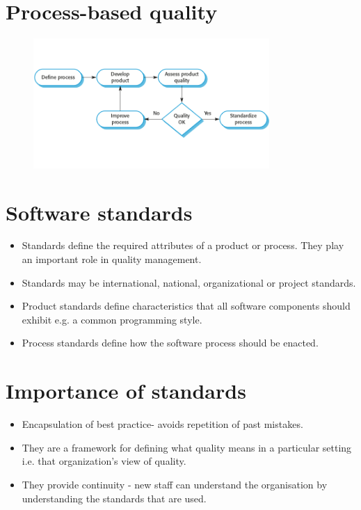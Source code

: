 \section {Process-based quality}
\begin{figure}[h!]
    \centering
    \includegraphics[width = 0.8\textwidth]{./figures/L7_2.png}
    \caption{}
    \label{fig:L7_2}
\end{figure}

\section {Software standards}
\begin{itemize}

\item Standards define the required attributes of a product or process. They play an important role in quality management.

\item Standards may be international, national, organizational or project standards.

\item Product standards define characteristics that all software components should exhibit e.g. a common programming style.

\item Process standards define how the software process should be enacted.
\end{itemize}
\section {Importance of standards}
\begin{itemize}


\item Encapsulation of best practice- avoids repetition of past mistakes.

\item They are a framework for defining what quality means in a particular setting i.e. that organization’s view of quality.

\item They provide continuity - new staff can understand the organisation by understanding the standards that are used.

\end{itemize}
